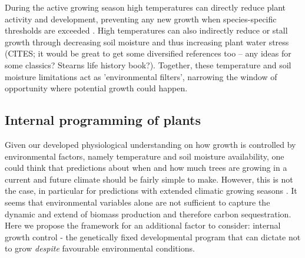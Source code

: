 \documentclass{article}
\begin{document}
During the active growing season high temperatures can directly reduce plant activity and development, preventing any new growth when species-specific thresholds are exceeded \citep{osullivanThermalLimitsLeaf2017}. High temperatures can also indirectly reduce or stall growth through decreasing soil moisture and thus increasing plant water stress (CITES; it would be great to get some diversified references too -- any ideas for some classics? Stearns life history book?). Together, these temperature and soil moisture limitations act as 'environmental filters', narrowing the window of opportunity where potential growth could happen.

		
		\subsection*{Internal programming of plants}
		Given our developed physiological understanding on how growth is controlled by environmental factors, namely temperature and soil moisture availability, one could think that predictions about when and how much trees are growing in a current and future climate should be fairly simple to make. However, this is not the case, in particular for predictions with extended climatic growing seasons \citep{zohnerHowChangesSpring2021}. It seems that environmental variables alone are not sufficient to capture the dynamic and extend of biomass production and therefore carbon sequestration.  Here we propose the framework for an additional factor to consider: internal growth control - the genetically fixed developmental program that can dictate not to grow \textit{despite} favourable environmental conditions.\\
		
\end{document}
